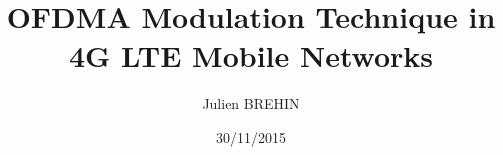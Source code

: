 




\title{OFDMA Modulation Technique in 4G LTE Mobile Networks}
\author{Julien BREHIN}
\date{30/11/2015}
\begin{titlepage}
\maketitle
\end{titlepage}

\tableofcontents









\printbibliography

